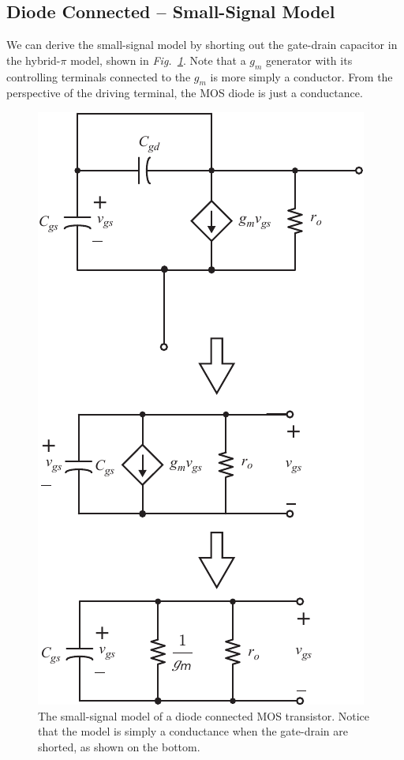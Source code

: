 \subsection{Diode Connected -- Small-Signal Model}
We can derive the small-signal model by shorting out the gate-drain capacitor in the hybrid-$\pi$ model, shown in \emph{Fig.~\ref{fig:4mos_diode_ss.pdf}}.  Note that a $g_m$ generator with its controlling terminals connected to the $g_m$ is more simply a conductor.  From the perspective of the driving terminal, the MOS diode is just a conductance.
\vspace{1cm}
\begin{figure}[H]
\centering
\includegraphics[scale=1.4]{4mos_diode_ss.pdf}
\caption{The small-signal model of a diode connected MOS transistor.  Notice that the model is simply a conductance when the gate-drain are shorted, as shown on the bottom.}
\label{fig:4mos_diode_ss.pdf}
\end{figure}
\newpage
